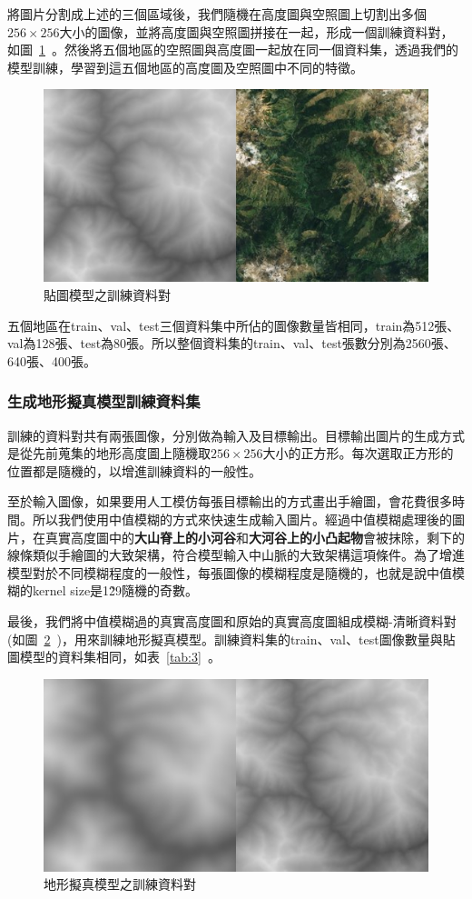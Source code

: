 \documentclass[a4paper, 12pt]{article}
\begin{document}
將圖片分割成上述的三個區域後，我們隨機在高度圖與空照圖上切割出多個$256 \times 256$大小的圖像，並將高度圖與空照圖拼接在一起，形成一個訓練資料對，如圖~\ref{fig:9}~。然後將五個地區的空照圖與高度圖一起放在同一個資料集，透過我們的模型訓練，學習到這五個地區的高度圖及空照圖中不同的特徵。

\begin{figure}[htbp]
    \centering
    \includegraphics[width=0.5\linewidth]{fig/9.jpg}
    \caption{貼圖模型之訓練資料對}
    \label{fig:9}
\end{figure}

五個地區在train、val、test三個資料集中所佔的圖像數量皆相同，train為512張、val為128張、test為80張。所以整個資料集的train、val、test張數分別為2560張、640張、400張。

\subsubsection{生成地形擬真模型訓練資料集}

訓練的資料對共有兩張圖像，分別做為輸入及目標輸出。目標輸出圖片的生成方式是從先前蒐集的地形高度圖上隨機取$256 \times 256$大小的正方形。每次選取正方形的位置都是隨機的，以增進訓練資料的一般性。

至於輸入圖像，如果要用人工模仿每張目標輸出的方式畫出手繪圖，會花費很多時間。所以我們使用中值模糊的方式來快速生成輸入圖片。經過中值模糊處理後的圖片，在真實高度圖中的\textbf{大山脊上的小河谷}和\textbf{大河谷上的小凸起物}會被抹除，剩下的線條類似手繪圖的大致架構，符合模型輸入中山脈的大致架構這項條件。為了增進模型對於不同模糊程度的一般性，每張圖像的模糊程度是隨機的，也就是說中值模糊的kernel size是1\~ 29隨機的奇數。

最後，我們將中值模糊過的真實高度圖和原始的真實高度圖組成模糊-清晰資料對(如圖~\ref{fig:10}~)，用來訓練地形擬真模型。訓練資料集的train、val、test圖像數量與貼圖模型的資料集相同，如表~\ref{tab:3}~。

\begin{figure}[htbp]
    \centering
    \includegraphics[width=0.5\linewidth]{fig/10.jpg}
    \caption{地形擬真模型之訓練資料對}
    \label{fig:10}
\end{figure}
\end{document}
